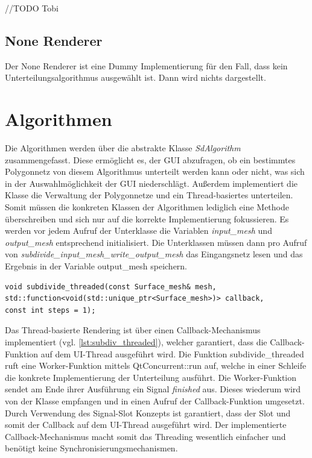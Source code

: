 //TODO Tobi

\subsection{None Renderer}
Der None Renderer ist eine Dummy Implementierung für den Fall,
dass kein Unterteilungsalgorithmus ausgewählt ist.
Dann wird nichts dargestellt.

\section{Algorithmen}

Die Algorithmen werden über die abstrakte Klasse \emph{SdAlgorithm} zusammengefasst. 
Diese ermöglicht es, der GUI abzufragen, ob ein bestimmtes Polygonnetz von diesem Algorithmus unterteilt werden kann oder nicht, was sich in der Auswahlmöglichkeit der GUI niederschlägt.
Außerdem implementiert die Klasse die Verwaltung der Polygonnetze und ein Thread-basiertes unterteilen. 
Somit müssen die konkreten Klassen der Algorithmen lediglich eine Methode überschreiben und sich nur auf die korrekte Implementierung fokussieren.
Es werden vor jedem Aufruf der Unterklasse die Variablen \emph{input\_mesh} und \emph{output\_mesh} entsprechend initialisiert.
Die Unterklassen müssen dann pro Aufruf von \emph{subdivide\_input\_mesh\_write\_output\_mesh} das Eingangsnetz lesen und das Ergebnis in der Variable output\_mesh speichern.

\begin{lstlisting}[style=myCppStyle, caption={Signatur der Unterteilungsfunktion}, label=lst:subdiv_threaded]
void subdivide_threaded(const Surface_mesh& mesh, 
std::function<void(std::unique_ptr<Surface_mesh>)> callback, 
const int steps = 1);
\end{lstlisting}

Das Thread-basierte Rendering ist über einen Callback-Mechanismus implementiert (vgl. \autoref{lst:subdiv_threaded}), welcher garantiert, dass die Callback-Funktion auf dem UI-Thread ausgeführt wird.
Die Funktion subdivide\_threaded ruft eine Worker-Funktion mittels QtConcurrent::run auf, welche in einer Schleife die konkrete Implementierung der Unterteilung ausführt.
Die Worker-Funktion sendet am Ende ihrer Ausführung ein Signal \emph{finished} aus.
Dieses wiederum wird von der Klasse empfangen und in einen Aufruf der Callback-Funktion umgesetzt.
Durch Verwendung des Signal-Slot Konzepts ist garantiert, dass der Slot und somit der Callback auf dem UI-Thread ausgeführt wird.
Der implementierte Callback-Mechanismus macht somit das Threading wesentlich einfacher und benötigt keine Synchronisierungsmechanismen.

